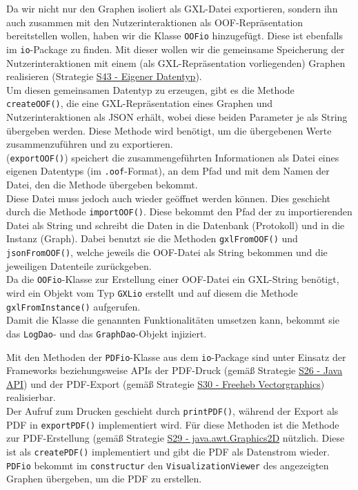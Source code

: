 \documentclass[enabledeprecatedfontcommands,fontsize=11pt,paper=a4,twoside]{scrartcl}
\newcounter{one}
\begin{document}
Da wir nicht nur den Graphen isoliert als GXL-Datei exportieren, sondern ihn auch zusammen mit den Nutzerinteraktionen als OOF-Repräsentation bereitstellen wollen, haben wir die Klasse \texttt{OOFio} hinzugefügt. Diese ist ebenfalls im \texttt{io}-Package zu finden. Mit dieser wollen wir die gemeinsame Speicherung der Nutzerinteraktionen mit einem (als GXL-Repräsentation vorliegenden) Graphen realisieren (Strategie \hyperlink{ooo}{S43 - Eigener Datentyp}). \\

Um diesen gemeinsamen Datentyp zu erzeugen, gibt es die Methode \texttt{createOOF()}, die eine GXL-Repräsentation eines Graphen und Nutzerinteraktionen als JSON erhält, wobei diese beiden Parameter je als String übergeben werden. Diese Methode wird benötigt, um die übergebenen Werte zusammenzuführen und zu exportieren. \\
(\texttt{exportOOF()}) speichert die zusammengeführten Informationen als Datei eines eigenen Datentyps (im \texttt{.oof}-Format), an dem Pfad und mit dem Namen der Datei, den die Methode übergeben bekommt. \\

Diese Datei muss jedoch auch wieder geöffnet werden können. Dies geschieht durch die Methode \texttt{importOOF()}. Diese bekommt den Pfad der zu importierenden Datei als String und schreibt die Daten in die Datenbank (Protokoll) und in die Instanz (Graph). Dabei benutzt sie die Methoden \texttt{gxlFromOOF()} und \texttt{jsonFromOOF()}, welche jeweils die OOF-Datei als String bekommen und die jeweiligen Datenteile zurückgeben. \\
Da die \texttt{OOFio}-Klasse zur Erstellung einer OOF-Datei ein GXL-String benötigt, wird ein Objekt vom Typ \texttt{GXLio} erstellt und auf diesem die Methode \texttt{gxlFromInstance()} aufgerufen.\\ 

Damit die Klasse die genannten Funktionalitäten umsetzen kann, bekommt sie das \texttt{LogDao}- und das \texttt{GraphDao}-Objekt injiziert. 

Mit den Methoden der \texttt{PDFio}-Klasse aus dem \texttt{io}-Package sind unter Einsatz der Frameworks beziehungsweise APIs der PDF-Druck (gemäß Strategie \hyperlink{ggg}{S26 - Java API}) und der PDF-Export (gemäß Strategie \hyperlink{iii}{S30 - Freeheb Vectorgraphics}) realisierbar. \\
Der Aufruf zum Drucken geschieht durch \texttt{printPDF()}, während der Export als PDF in \texttt{exportPDF()} implementiert wird. Für diese Methoden ist die Methode zur PDF-Erstellung (gemäß Strategie \hyperlink{hhh}{S29 - java.awt.Graphics2D} nützlich. Diese ist als \texttt{createPDF()} implementiert und gibt die PDF als Datenstrom wieder. \\
\texttt{PDFio} bekommt im \texttt{constructur} den \texttt{VisualizationViewer} des angezeigten Graphen übergeben, um die PDF zu erstellen. \\
\end{document}
